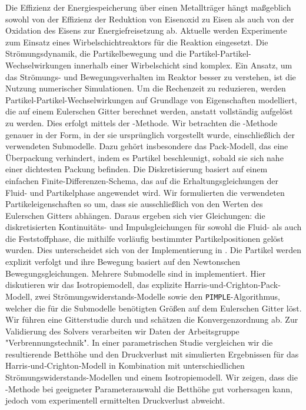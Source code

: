 
\Abstract
Die Effizienz der Energiespeicherung über einen Metallträger hängt maßgeblich sowohl von der Effizienz der Reduktion von Eisenoxid zu Eisen als auch von der Oxidation des Eisens zur Energiefreisetzung ab. Aktuelle werden Experimente zum Einsatz eines Wirbelschichtreaktors für die Reaktion eingesetzt. Die Strömungsdynamik, die Partikelbewegung und die Partikel-Partikel-Wechselwirkungen innerhalb einer Wirbelschicht sind komplex. Ein Ansatz, um das Strömungs- und Bewegungsverhalten im Reaktor besser zu verstehen, ist die Nutzung numerischer Simulationen.
Um die Rechenzeit zu reduzieren, werden Partikel-Partikel-Wechselwirkungen auf Grundlage von Eigenschaften modelliert, die auf einem Eulerschen Gitter berechnet werden, anstatt vollständig aufgelöst zu werden. Dies erfolgt mittels der \MPns-Methode. Wir betrachten die \MPns-Methode genauer in der Form, in der sie ursprünglich vorgestellt wurde, einschließlich der verwendeten Submodelle. Dazu gehört insbesondere das Pack-Modell, das eine Überpackung verhindert, indem es Partikel beschleunigt, sobald sie sich nahe einer dichtesten Packung befinden.
Die Diskretisierung basiert auf einem einfachen Finite-Differenzen-Schema, das auf die Erhaltungsgleichungen der Fluid- und Partikelphase angewendet wird. Wir formulierten die verwendeten Partikeleigenschaften so um, dass sie ausschließlich von den Werten des Eulerschen Gitters abhängen. Daraus ergeben sich vier Gleichungen: die diskretisierten Kontinuitäts- und Impulsgleichungen für sowohl die Fluid- als auch die Feststoffphase, die mithilfe vorläufig bestimmter Partikelpositionen gelöst wurden. Dies unterscheidet sich von der Implementierung in \OF.
Die Partikel werden explizit verfolgt und ihre Bewegung basiert auf den Newtonschen Bewegungsgleichungen. Mehrere Submodelle sind in \OF implementiert. Hier diskutieren wir das Isotropiemodell, das explizite Harris-und-Crighton-Pack-Modell, zwei Strömungswiderstands-Modelle sowie den \lstinline|PIMPLE|-Algorithmus, welcher die für die Submodelle benötigten Größen auf dem Eulerschen Gitter löst.
Wir führen eine Gitterstudie durch und schätzen die Konvergenzordnung ab. Zur Validierung des Solvers verarbeiten wir Daten der Arbeitsgruppe "Verbrennungstechnik". In einer parametrischen Studie vergleichen wir die resultierende Betthöhe und den Druckverlust mit simulierten Ergebnissen für das Harris‑und‑Crighton‑Modell in Kombination mit unterschiedlichen Strömungswiderstands-Modellen und einem Isotropiemodell. Wir zeigen, dass die \MP-Methode bei geeigneter Parameterauswahl die Betthöhe gut vorhersagen kann, jedoch vom experimentell ermittelten Druckverlust abweicht.
